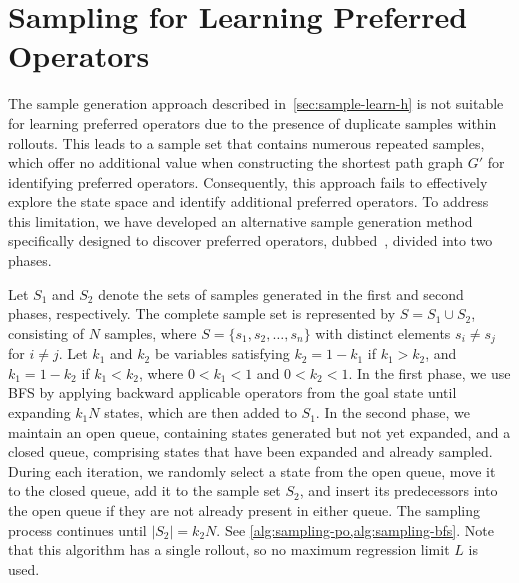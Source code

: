 \documentclass[ppgc,diss,english]{iiufrgs}
\begin{document}
\section{Sampling for Learning Preferred Operators}
\label{sec:sample-learn-po}
The sample generation approach described in~\cref{sec:sample-learn-h} is not suitable for learning preferred operators due to the presence of duplicate samples within rollouts. This leads to a sample set that contains numerous repeated samples, which offer no additional value when constructing the shortest path graph $G'$ for identifying preferred operators. Consequently, this approach fails to effectively explore the state space and identify additional preferred operators. To address this limitation, we have developed an alternative sample generation method specifically designed to discover preferred operators, dubbed~\bfsrs, divided into two phases.

Let $S_1$ and $S_2$ denote the sets of samples generated in the first and second phases, respectively. The complete sample set is represented by $S = S_1 \cup S_2$, consisting of $N$ samples, where $S = \{ s_1, s_2, \ldots, s_n\}$ with distinct elements $s_i \neq s_j$ for $i \neq j$. Let $k_1$ and $k_2$ be variables satisfying $k_2 = 1 - k_1$ if $k_1 > k_2$, and $k_1 = 1 - k_2$ if $k_1 < k_2$, where $0 < k_1 < 1$ and $0 < k_2 < 1$.
In the first phase, we use BFS by applying backward applicable operators from the goal state until expanding $k_1N$ states, which are then added to $S_1$.
In the second phase, we maintain an open queue, containing states generated but not yet expanded, and a closed queue, comprising states that have been expanded and already sampled. During each iteration, we randomly select a state from the open queue, move it to the closed queue, add it to the sample set $S_2$, and insert its predecessors into the open queue if they are not already present in either queue. The sampling process continues until $|S_2| = k_2N$. See \cref{alg:sampling-po,alg:sampling-bfs}. Note that this algorithm has a single rollout, so no maximum regression limit $L$ is used.
\end{document}
